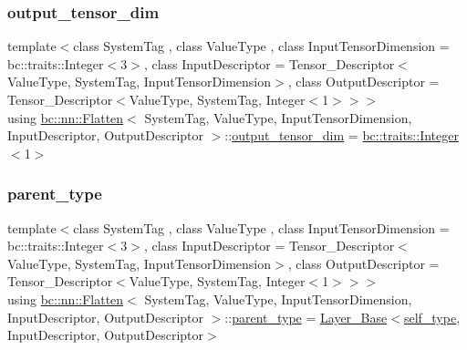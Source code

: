 \subsubsection{\texorpdfstring{output\+\_\+tensor\+\_\+dim}{output\_tensor\_dim}}
{\footnotesize\ttfamily template$<$class System\+Tag , class Value\+Type , class Input\+Tensor\+Dimension  = bc\+::traits\+::\+Integer$<$3$>$, class Input\+Descriptor  = Tensor\+\_\+\+Descriptor$<$\+Value\+Type, System\+Tag, Input\+Tensor\+Dimension$>$, class Output\+Descriptor  = Tensor\+\_\+\+Descriptor$<$\+Value\+Type, System\+Tag, Integer$<$1$>$$>$$>$ \\
using \hyperlink{structbc_1_1nn_1_1Flatten}{bc\+::nn\+::\+Flatten}$<$ System\+Tag, Value\+Type, Input\+Tensor\+Dimension, Input\+Descriptor, Output\+Descriptor $>$\+::\hyperlink{structbc_1_1nn_1_1Flatten_a15ddd4e65597ff56624b08d498a47c6d}{output\+\_\+tensor\+\_\+dim} =  \hyperlink{structbc_1_1traits_1_1Integer}{bc\+::traits\+::\+Integer}$<$1$>$}

\mbox{\label{structbc_1_1nn_1_1Flatten_adad203394f78c9d3bd9b0962c8ca195e}} 
\subsubsection{\texorpdfstring{parent\+\_\+type}{parent\_type}}
{\footnotesize\ttfamily template$<$class System\+Tag , class Value\+Type , class Input\+Tensor\+Dimension  = bc\+::traits\+::\+Integer$<$3$>$, class Input\+Descriptor  = Tensor\+\_\+\+Descriptor$<$\+Value\+Type, System\+Tag, Input\+Tensor\+Dimension$>$, class Output\+Descriptor  = Tensor\+\_\+\+Descriptor$<$\+Value\+Type, System\+Tag, Integer$<$1$>$$>$$>$ \\
using \hyperlink{structbc_1_1nn_1_1Flatten}{bc\+::nn\+::\+Flatten}$<$ System\+Tag, Value\+Type, Input\+Tensor\+Dimension, Input\+Descriptor, Output\+Descriptor $>$\+::\hyperlink{structbc_1_1nn_1_1Flatten_adad203394f78c9d3bd9b0962c8ca195e}{parent\+\_\+type} =  \hyperlink{structbc_1_1nn_1_1Layer__Base}{Layer\+\_\+\+Base}$<$\hyperlink{structbc_1_1nn_1_1Flatten_a8bf8c3ab507fae549695110b4c1d4762}{self\+\_\+type}, Input\+Descriptor, Output\+Descriptor$>$}

\mbox{\label{structbc_1_1nn_1_1Flatten_a8bf8c3ab507fae549695110b4c1d4762}} 
